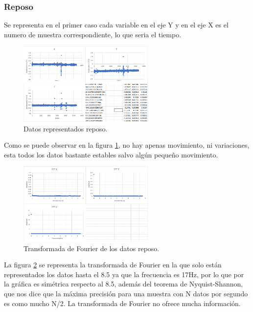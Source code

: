 \documentclass[12pt]{article}
\numberwithin{equation}{section}
\begin{document}
\newpage

\subsubsection{Reposo}

Se representa en el primer caso cada variable en el eje Y y en el eje X es el numero de muestra correspondiente, lo que seria el tiempo.

\begin{figure}[h]
    \centering
    \includegraphics[width=0.6\textwidth]{reposoraw.png}
    \caption{Datos representados reposo.}
    \label{fig:reposoraw}
\end{figure}

Como se puede observar en la figura \ref{fig:reposoraw}, no hay apenas movimiento, ni variaciones, esta todos los datos bastante estables salvo algún pequeño movimiento.

\begin{figure}[h]
    \centering
    \includegraphics[width=0.6\textwidth]{reposofft.png}
    \caption{Transformada de Fourier de los datos reposo.}
    \label{fig:reposofft}
\end{figure}

La figura \ref{fig:reposofft} se representa la transformada de Fourier en la que solo están representados los datos hasta el 8.5 ya que la frecuencia es 17Hz, por lo que por la gráfica es simétrica respecto al 8.5, además del teorema de Nyquist-Shannon, que nos dice que la máxima precisión para una muestra con N datos por segundo es como mucho N/2. La transformada de Fourier no ofrece mucha información.
\end{document}

